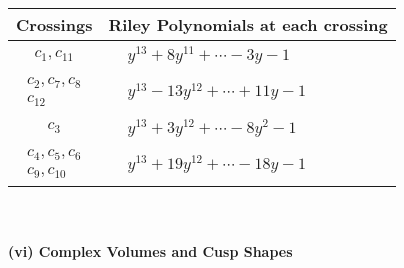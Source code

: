 \documentclass[1p]{elsarticle_modified}
\theoremstyle{definition}
\begin{document}
\begin{tabular}{m{50pt}|m{274pt}}
Crossings & \hspace{64pt}Riley Polynomials at each crossing \\
\hline $$\begin{aligned}c_{1},c_{11}\end{aligned}$$&$\begin{aligned}
&y^{13}+8 y^{11}+\cdots-3 y-1
\end{aligned}$\\
\hline $$\begin{aligned}c_{2},c_{7},c_{8}\\c_{12}\end{aligned}$$&$\begin{aligned}
&y^{13}-13 y^{12}+\cdots+11 y-1
\end{aligned}$\\
\hline $$\begin{aligned}c_{3}\end{aligned}$$&$\begin{aligned}
&y^{13}+3 y^{12}+\cdots-8 y^2-1
\end{aligned}$\\
\hline $$\begin{aligned}c_{4},c_{5},c_{6}\\c_{9},c_{10}\end{aligned}$$&$\begin{aligned}
&y^{13}+19 y^{12}+\cdots-18 y-1
\end{aligned}$\\
\hline
\end{tabular}\\~\\
\newpage\flushleft \textbf{(vi) Complex Volumes and Cusp Shapes}
\end{document}
